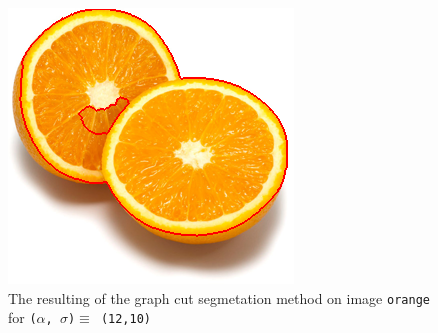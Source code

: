 {\begin{minipage}{0.45\linewidth}
    \vfill
    \begin{figure}[H]
      \includegraphics[scale=0.5]{./images/04/Q11/var_a_b/orange/graphcut2_a12_s10.png}
      \caption{The resulting of the graph cut segmetation method on image \texttt{orange} for
        \texttt{($\alpha$, $\sigma$)$ \equiv$ (12,10)}}
      \label{fig:04_orange2_a12_s10}
    \end{figure}
  \end{minipage}
}

